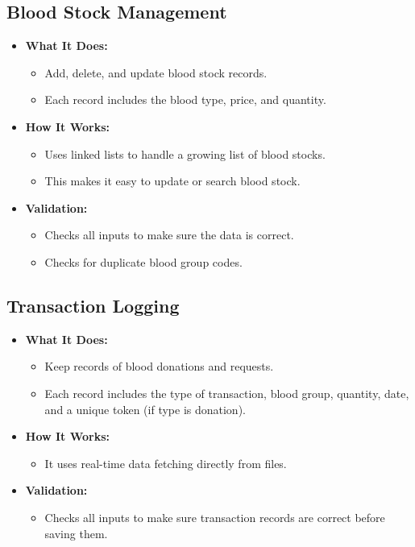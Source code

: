 \documentclass[12pt,a4paper]{report}
\begin{document}
\subsection{Blood Stock Management}
\begin{itemize}
    \item \normalsize \textbf{What It Does:}
    \begin{itemize}
        \item Add, delete, and update blood stock records.
        \item Each record includes the blood type, price, and quantity.
    \end{itemize}
    \item \normalsize \textbf{How It Works:}
    \begin{itemize}
        \item Uses linked lists to handle a growing list of blood stocks.
        \item This makes it easy to update or search blood stock.
    \end{itemize}
    \item \normalsize \textbf{Validation:}
    \begin{itemize}
        \item Checks all inputs to make sure the data is correct.
        \item Checks for duplicate blood group codes.
    \end{itemize}
\end{itemize}

\subsection{Transaction Logging}
\begin{itemize}
    \item \normalsize \textbf{What It Does:}
    \begin{itemize}
        \item Keep records of blood donations and requests.
        \item Each record includes the type of transaction, blood group, quantity, date, and a unique token (if type is donation).
    \end{itemize}
    \item \normalsize \textbf{How It Works:}
    \begin{itemize}
        \item It uses real-time data fetching directly from files.
    \end{itemize}
    \item \normalsize \textbf{Validation:}
    \begin{itemize}
        \item Checks all inputs to make sure transaction records are correct before saving them.
    \end{itemize}
\end{itemize}
\end{document}
